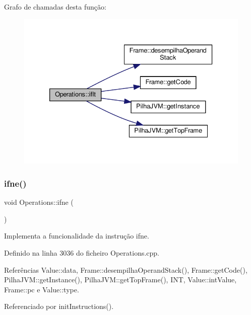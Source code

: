 Grafo de chamadas desta função\+:\nopagebreak
\begin{figure}[H]
\begin{center}
\leavevmode
\includegraphics[width=333pt]{classOperations_a0a9460ea938fc3a9bbd2102578d50ee2_cgraph}
\end{center}
\end{figure}
\mbox{\label{classOperations_aaadc2a6aaf1d3be06e918930622dad29}} 
\subsubsection{\texorpdfstring{ifne()}{ifne()}}
{\footnotesize\ttfamily void Operations\+::ifne (\begin{DoxyParamCaption}{ }\end{DoxyParamCaption})\hspace{0.3cm}{\ttfamily [private]}}



Implementa a funcionalidade da instrução ifne. 



Definido na linha 3036 do ficheiro Operations.\+cpp.



Referências Value\+::data, Frame\+::desempilha\+Operand\+Stack(), Frame\+::get\+Code(), Pilha\+J\+V\+M\+::get\+Instance(), Pilha\+J\+V\+M\+::get\+Top\+Frame(), I\+NT, Value\+::int\+Value, Frame\+::pc e Value\+::type.



Referenciado por init\+Instructions().

